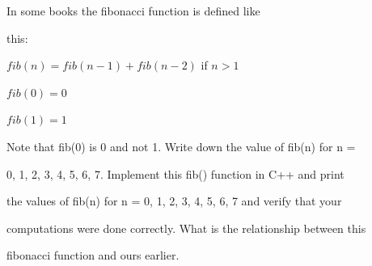 In some books the fibonacci function is defined like

this:



$fib(n) = fib(n-1) + fib(n-2)$ if $n > 1$



$fib(0) = 0$



$fib(1) = 1$



Note that fib(0) is 0 and not 1. Write down the value of fib(n) for n =

0, 1, 2, 3, 4, 5, 6, 7. Implement this fib() function in C++ and print

the values of fib(n) for n = 0, 1, 2, 3, 4, 5, 6, 7 and verify that your

computations were done correctly. What is the relationship between this

fibonacci function and ours earlier.

